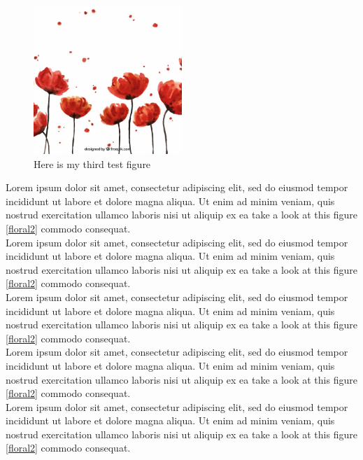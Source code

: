 \documentclass[a4paper,12pt]{article}
\begin{document}
\begin{figure}
\centering
\includegraphics[width=0.5\textwidth]{Images/dummy_3}
\caption{Here is my third test figure}
\end{figure}
Lorem ipsum dolor sit amet, consectetur adipiscing elit, sed do eiusmod tempor incididunt ut labore et dolore magna aliqua. Ut enim ad minim veniam, quis nostrud exercitation ullamco laboris nisi ut aliquip ex ea take a look at this figure \ref{floral2} commodo consequat.\\
Lorem ipsum dolor sit amet, consectetur adipiscing elit, sed do eiusmod tempor incididunt ut labore et dolore magna aliqua. Ut enim ad minim veniam, quis nostrud exercitation ullamco laboris nisi ut aliquip ex ea take a look at this figure \ref{floral2} commodo consequat.\\
Lorem ipsum dolor sit amet, consectetur adipiscing elit, sed do eiusmod tempor incididunt ut labore et dolore magna aliqua. Ut enim ad minim veniam, quis nostrud exercitation ullamco laboris nisi ut aliquip ex ea take a look at this figure \ref{floral2} commodo consequat.\\
Lorem ipsum dolor sit amet, consectetur adipiscing elit, sed do eiusmod tempor incididunt ut labore et dolore magna aliqua. Ut enim ad minim veniam, quis nostrud exercitation ullamco laboris nisi ut aliquip ex ea take a look at this figure \ref{floral2} commodo consequat.\\
Lorem ipsum dolor sit amet, consectetur adipiscing elit, sed do eiusmod tempor incididunt ut labore et dolore magna aliqua. Ut enim ad minim veniam, quis nostrud exercitation ullamco laboris nisi ut aliquip ex ea take a look at this figure \ref{floral2} commodo consequat.
\end{document}
